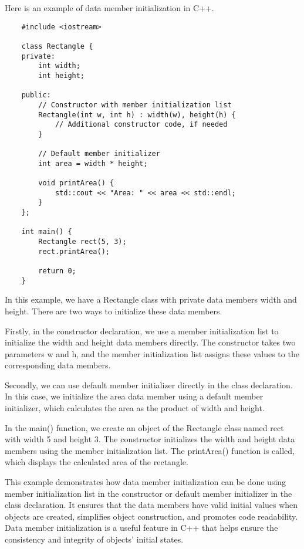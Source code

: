 \begin{solution}
    Here is an example of data member initialization in C++.
    \horizontalline
    \begin{verbatim}
    #include <iostream>

    class Rectangle {
    private:
        int width;
        int height;
    
    public:
        // Constructor with member initialization list
        Rectangle(int w, int h) : width(w), height(h) {
            // Additional constructor code, if needed
        }
    
        // Default member initializer
        int area = width * height;
    
        void printArea() {
            std::cout << "Area: " << area << std::endl;
        }
    };
    
    int main() {
        Rectangle rect(5, 3);
        rect.printArea();
    
        return 0;
    }        
    \end{verbatim}
    
    \horizontalline

    In this example, we have a Rectangle class with private data members width and height. There are two ways to initialize these data members.

    \noindent Firstly, in the constructor declaration, we use a member initialization list to initialize the width and height data members directly. The constructor takes two parameters w and h, and the member initialization 
    list assigns these values to the corresponding data members.

    \noindent Secondly, we can use default member initializer directly in the class declaration. In this case, we initialize the area data member using a default member initializer, which calculates the area as the product 
    of width and height.

    \noindent In the main() function, we create an object of the Rectangle class named rect with width 5 and height 3. The constructor initializes the width and height data members using the member initialization list. The 
    printArea() function is called, which displays the calculated area of the rectangle.

    \noindent This example demonstrates how data member initialization can be done using member initialization list in the constructor or default member initializer in the class declaration. It ensures that the data members 
    have valid initial values when objects are created, simplifies object construction, and promotes code readability. Data member initialization is a useful feature in C++ that helps ensure the consistency and integrity of 
    objects' initial states.
\end{solution}

